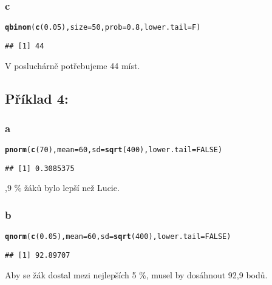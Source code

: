 \documentclass[twoside]{article}\usepackage[]{graphicx}\usepackage[]{color}
\makeatletter
\newcommand{\hlnum}[1]{\textcolor[rgb]{0.686,0.059,0.569}{#1}}%
\newcommand{\hlstd}[1]{\textcolor[rgb]{0.345,0.345,0.345}{#1}}%
\newcommand{\hlkwc}[1]{\textcolor[rgb]{0.333,0.667,0.333}{#1}}%
\newcommand{\hlkwd}[1]{\textcolor[rgb]{0.737,0.353,0.396}{\textbf{#1}}}%
\newenvironment{kframe}{%
 \def\at@end@of@kframe{}%
 \ifinner\ifhmode%
  \def\at@end@of@kframe{\end{minipage}}%
  \begin{minipage}{\columnwidth}%
 \fi\fi%
 \def\FrameCommand##1{\hskip\@totalleftmargin \hskip-\fboxsep
 \colorbox{shadecolor}{##1}\hskip-\fboxsep
     \hskip-\linewidth \hskip-\@totalleftmargin \hskip\columnwidth}%
 \MakeFramed {\advance\hsize-\width
   \@totalleftmargin\z@ \linewidth\hsize
   \@setminipage}}%
 {\par\unskip\endMakeFramed%
 \at@end@of@kframe}
\newenvironment{knitrout}{}{} %
\makeatother
\begin{document}
\subsubsection*{c}
\begin{knitrout}
\color{fgcolor}\begin{kframe}
\begin{alltt}
\hlkwd{qbinom}\hlstd{(}\hlkwd{c}\hlstd{(}\hlnum{0.05}\hlstd{),} \hlkwc{size}\hlstd{=}\hlnum{50}\hlstd{,} \hlkwc{prob}\hlstd{=}\hlnum{0.8}\hlstd{,} \hlkwc{lower.tail}\hlstd{=F)}
\end{alltt}
\begin{verbatim}
## [1] 44
\end{verbatim}
\end{kframe}
\end{knitrout}
V posluchárně potřebujeme 44 míst.

\subsection*{Příklad 4:}
\subsubsection*{a}
\begin{knitrout}
\color{fgcolor}\begin{kframe}
\begin{alltt}
\hlkwd{pnorm}\hlstd{(}\hlkwd{c}\hlstd{(}\hlnum{70}\hlstd{),} \hlkwc{mean}\hlstd{=}\hlnum{60}\hlstd{,} \hlkwc{sd}\hlstd{=}\hlkwd{sqrt}\hlstd{(}\hlnum{400}\hlstd{),} \hlkwc{lower.tail}\hlstd{=}\hlnum{FALSE}\hlstd{)}
\end{alltt}
\begin{verbatim}
## [1] 0.3085375
\end{verbatim}
\end{kframe}
\end{knitrout}
30,9 \% žáků bylo lepší než Lucie.
\subsubsection*{b}
\begin{knitrout}
\color{fgcolor}\begin{kframe}
\begin{alltt}
\hlkwd{qnorm}\hlstd{(}\hlkwd{c}\hlstd{(}\hlnum{0.05}\hlstd{),} \hlkwc{mean}\hlstd{=}\hlnum{60}\hlstd{,} \hlkwc{sd}\hlstd{=}\hlkwd{sqrt}\hlstd{(}\hlnum{400}\hlstd{),} \hlkwc{lower.tail}\hlstd{=}\hlnum{FALSE}\hlstd{)}
\end{alltt}
\begin{verbatim}
## [1] 92.89707
\end{verbatim}
\end{kframe}
\end{knitrout}
Aby se žák dostal mezi nejlepších 5 \%, musel by dosáhnout 92,9 bodů.
\end{document}
